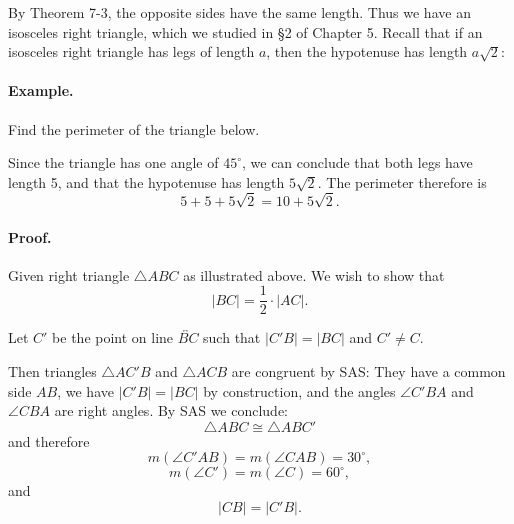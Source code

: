 \documentclass[12pt]{book} %
\begin{document}

By Theorem 7-3, the opposite sides have the same length. Thus we have an isosceles right triangle, which we studied in \S2 of Chapter 5. Recall that if an isosceles right triangle has legs of length $a$, then the hypotenuse has length $a\sqrt{2}$:



\paragraph{Example.}
Find the perimeter of the triangle below.


Since the triangle has one angle of $45^\circ$, we can conclude that both legs have length 5, and that the hypotenuse has length $5\sqrt{2}$. The perimeter therefore is
\[
5+5+5\sqrt{2}=10+5\sqrt{2}.
\]



\paragraph{Proof.}
Given right triangle $\triangle ABC$ as illustrated above. We wish to show that
\[
|BC|=\frac12\cdot |AC|.
\]

Let $C'$ be the point on line $\overleftrightarrow{BC}$ such that $|C'B|=|BC|$ and $C'\ne C$.


Then triangles $\triangle AC'B$ and $\triangle ACB$ are congruent by SAS: They have a common side $AB$, we have $|C'B|=|BC|$ by construction, and the angles $\angle C'BA$ and $\angle CBA$ are right angles. By SAS we conclude:
\[
\triangle ABC\cong\triangle ABC'
\]
and therefore
\[
m(\angle C'AB)=m(\angle CAB)=30^\circ,
\]
\[
m(\angle C')=m(\angle C)=60^\circ,
\]
and
\[
|CB|=|C'B|.
\]
\end{document}
